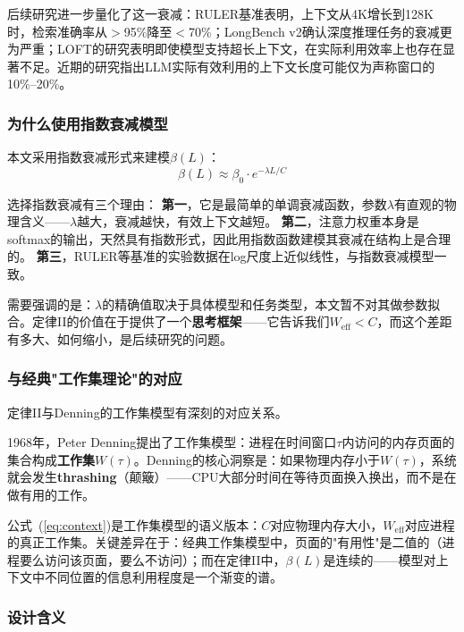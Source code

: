 后续研究进一步量化了这一衰减：RULER基准表明，上下文从4K增长到128K时，检索准确率从$>$95\%降至$<$70\%\cite{ruler2024}；LongBench v2确认深度推理任务的衰减更为严重\cite{longbenchv2_2024}；LOFT的研究表明即使模型支持超长上下文，在实际利用效率上也存在显著不足\cite{loft2024}。近期的研究指出LLM实际有效利用的上下文长度可能仅为声称窗口的10\%--20\%。

\subsubsection{为什么使用指数衰减模型}

本文采用指数衰减形式来建模$\beta(L)$：
\begin{equation}
\beta(L) \approx \beta_0 \cdot e^{-\lambda L / C}
\end{equation}

选择指数衰减有三个理由：
\textbf{第一}，它是最简单的单调衰减函数，参数$\lambda$有直观的物理含义——$\lambda$越大，衰减越快，有效上下文越短。
\textbf{第二}，注意力权重本身是softmax的输出，天然具有指数形式，因此用指数函数建模其衰减在结构上是合理的。
\textbf{第三}，RULER等基准的实验数据在log尺度上近似线性\cite{ruler2024}，与指数衰减模型一致。

需要强调的是：$\lambda$的精确值取决于具体模型和任务类型，本文暂不对其做参数拟合。定律II的价值在于提供了一个\textbf{思考框架}——它告诉我们$W_{\mathrm{eff}} < C$，而这个差距有多大、如何缩小，是后续研究的问题。

\subsubsection{与经典"工作集理论"的对应}

定律II与Denning的工作集模型有深刻的对应关系\cite{denning1968thrashing}。

1968年，Peter Denning提出了工作集模型：进程在时间窗口$\tau$内访问的内存页面的集合构成\textbf{工作集}$W(\tau)$。Denning的核心洞察是：如果物理内存小于$W(\tau)$，系统就会发生\textbf{thrashing}（颠簸）——CPU大部分时间在等待页面换入换出，而不是在做有用的工作\cite{denning1968thrashing,denning2020workingset}。

公式~(\ref{eq:context})是工作集模型的语义版本：$C$对应物理内存大小，$W_{\mathrm{eff}}$对应进程的真正工作集。关键差异在于：经典工作集模型中，页面的"有用性"是二值的（进程要么访问该页面，要么不访问）；而在定律II中，$\beta(L)$是连续的——模型对上下文中不同位置的信息利用程度是一个渐变的谱。

\subsubsection{设计含义}


